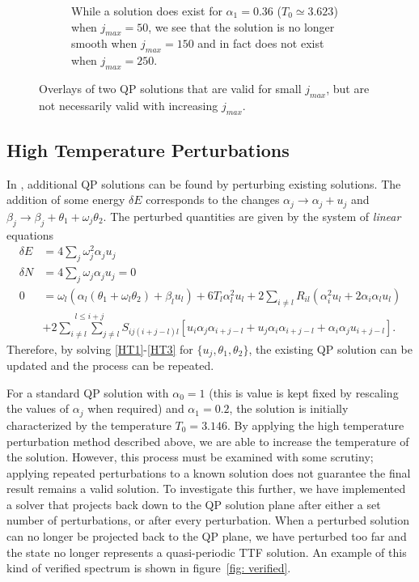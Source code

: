 \documentclass[letterpaper,11pt]{article}
\newcommand{\oj}{\omega_j}
\newcommand{\ol}{\omega_l}
\begin{document}
\begin{figure}[h]
\begin{subfigure}[t]{0.45\textwidth}
		\caption{While a solution does exist for $\alpha_1 = 0.36$ ($T_0 \simeq 3.623$) when $j_{max}=50$, we see that the solution is no longer smooth when $j_{max}=150$ and in fact does not exist when $j_{max}=250$.}
		\label{fig: a0.36solns}
	\end{subfigure}
	\caption{Overlays of two QP solutions that are valid for small $j_{max}$, but are not necessarily valid with increasing $j_{max}$.}
\end{figure}

\subsection{High Temperature Perturbations}
In \cite{1507.08261}, additional QP solutions can be found by perturbing existing solutions. The addition of some energy $\delta E$ corresponds to the changes $\alpha_j \to \alpha_j + u_j$ and $\beta_j \to \beta_j + \theta_1 + \omega_j \theta_2$. The perturbed quantities are given by the system of \emph{linear} equations
\begin{align}
\label{HT1}
\delta E &= 4 \sum_j \omega^2_j \alpha_j u_j \\
\label{HT2}
\delta N &= 4 \sum_j \oj \alpha_j u_j = 0 \\
\label{HT3}
0 &= \ol \left( \alpha_l (\theta_1 + \ol \theta_2) +\beta_l u_l \right) + 6T_l \alpha_l^2 u_l + 2 \sum_{i \neq l} R_{il} (\alpha_i^2 u_l + 2 \alpha_i \alpha_l u_l ) \nonumber \\
& + 2 \stackrel{l \leq i + j}{\sum_{i \neq l} \sum_{j \neq l}} S_{ij(i+j-l)l} \left[ u_i \alpha_j \alpha_{i+j-l} + u_j \alpha_i \alpha_{i+j-l} + \alpha_i \alpha_j u_{i+j-l} \right].
\end{align}
Therefore, by solving \eqref{HT1}-\eqref{HT3} for $\{ u_j, \theta_1, \theta_2 \}$, the existing QP solution can be updated and the process can be repeated. 

For a standard QP solution with $\alpha_0 = 1$ (this is value is kept fixed by rescaling the values of $\alpha_j$ when required) and $\alpha_1 = 0.2$, the solution is initially characterized by the temperature $T_0 = 3.146$. By applying the high temperature perturbation method described above, we are able to increase the temperature of the solution. However, this process must be examined with some scrutiny; applying repeated perturbations to a known solution does not guarantee the final result remains a valid solution. To investigate this further, we have implemented a solver that projects back down to the QP solution plane after either a set number of perturbations, or after every perturbation. When a perturbed solution can no longer be projected back to the QP plane, we have perturbed too far and the state no longer represents a quasi-periodic TTF solution. An example of this kind of verified spectrum is shown in figure~\ref{fig: verified}.
\end{document}
